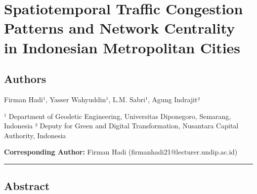 \section{Spatiotemporal Traffic Congestion Patterns and Network Centrality in Indonesian Metropolitan Cities}\label{spatiotemporal-traffic-congestion-patterns-and-network-centrality-in-indonesian-metropolitan-cities}

\subsection{Authors}\label{authors}

Firman Hadi¹, Yasser Wahyuddin¹, L.M. Sabri¹, Agung Indrajit²

¹ Department of Geodetic Engineering, Universitas Diponegoro, Semarang, Indonesia ² Deputy for Green and Digital Transformation, Nusantara Capital Authority, Indonesia

\textbf{Corresponding Author:} Firman Hadi (firmanhadi21@lecturer.undip.ac.id)

\begin{center}\rule{0.5\linewidth}{0.5pt}\end{center}

\subsection{Abstract}\label{abstract}

